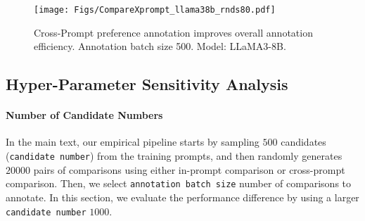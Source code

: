 \begin{figure}[h!]
    \centering
    \texttt{[image: Figs/CompareXprompt\_llama38b\_rnds80.pdf]}
    \caption{\small Cross-Prompt preference annotation improves overall annotation efficiency. Annotation batch size 500. Model: LLaMA3-8B.}
    \label{fig:results_xprompt_inprompt_abs500_llama38b}
\end{figure} 







\clearpage
\subsection{Hyper-Parameter Sensitivity Analysis}
\label{appdx:more_results_hyper_param_sensitivity}

\paragraph{Number of Candidate Numbers}
In the main text, our empirical pipeline starts by sampling $500$ candidates (\texttt{candidate number}) from the training prompts, and then randomly generates $20000$ pairs of comparisons using either in-prompt comparison or cross-prompt comparison. Then, we select \texttt{annotation batch size} number of comparisons to annotate. In this section, we evaluate the performance difference by using a larger \texttt{candidate number} $1000$. 

